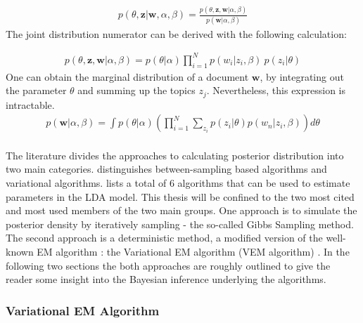 \documentclass[11pt,a4paper]{article}
\begin{document}
\begin{align}\label{posterior}
p(\theta,\textbf{z}|\textbf{w},\alpha,\beta)= \frac{p(\theta,\textbf{z},\textbf{w}|\alpha,\beta)}
{p(\textbf{w}|\alpha, \beta)}
\end{align}
The joint distribution numerator can be derived with the following calculation:

\begin{align}\label{joint}
p(\theta,\textbf{z},\textbf{w}|\alpha,\beta)=p(\theta|\alpha)\prod_{i=1}^{N}p(w_i|z_i,\beta)\ p(z_i|\theta)
\end{align}
One can obtain the marginal distribution of a document $\textbf{w}$, by integrating out the parameter $\theta$ and summing up the topics $z_j$. Nevertheless, this expression is intractable.
\begin{align}\label{marginal}
p(\textbf{w}|\alpha, \beta)=\int p(\theta|\alpha) \left( \prod_{i=1}^{N} \sum_{z_i}p(z_i|\theta)p(w_n|z_i,\beta) \right) d\theta
\end{align}
\ \\
The literature divides the approaches to calculating posterior distribution into two main categories.\cite{Blei2012} distinguishes between-sampling based algorithms and variational algorithms. \cite{Powieser2012} lists a total of 6 algorithms that can be used to estimate parameters in the LDA model. This thesis will be confined to the two most cited and most used members of the two main groups. One approach is to simulate the posterior density by iteratively sampling - the so-called Gibbs Sampling method. The second approach is a deterministic method, a modified version of the well-known EM algorithm \cite{Dempster1977}: the Variational EM algorithm (VEM algorithm) \cite{Wainwright2008}. In the following two sections the both approaches are roughly outlined to give the reader some insight into the Bayesian inference underlying the algorithms.

\subsubsection{Variational EM Algorithm}
\end{document}
